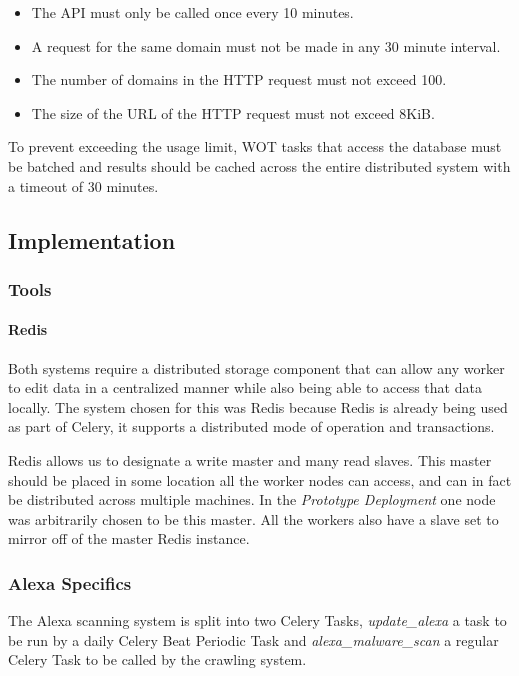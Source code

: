 \begin{itemize}
    \item The API must only be called once every 10 minutes.
    \item A request for the same domain must not be made in any 30 minute interval.
    \item The number of domains in the HTTP request must not exceed 100.
    \item The size of the URL of the HTTP request must not exceed 8KiB.
\end{itemize}

To prevent exceeding the usage limit, WOT tasks that access the database must be batched and results should be cached across the entire distributed system with a timeout of 30 minutes.


\subsection{Implementation}
\subsubsection{Tools}
\paragraph{Redis}
Both systems require a distributed storage component that can allow any worker to edit data in a centralized manner while also being able to access that data locally. The system chosen for this was Redis\cite{redis} because Redis is already being used as part of Celery, it supports a distributed mode of operation and transactions.

Redis allows us to designate a write master and many read slaves. This master should be placed in some location all the worker nodes can access, and can in fact be distributed across multiple machines.  In the \emph{Prototype Deployment} one node was arbitrarily chosen to be this master. All the workers also have a slave set to mirror off of the master Redis instance.

\subsubsection{Alexa Specifics}
The Alexa scanning system is split into two Celery Tasks, \emph{update\_alexa} a task to be run by a daily Celery Beat Periodic Task and \emph{alexa\_malware\_scan} a regular Celery Task to be called by the crawling system.

